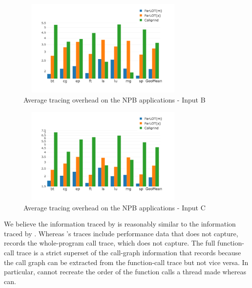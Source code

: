 \begin{figure}[t]
\centering
\includegraphics[width=3.4in,height=1.9in]{figs.comet.newMed/comet_chartAvg_sd_B_p3_5.png}
\caption{Average tracing overhead on the NPB applications - Input B}
\label{comet_chartAvg_sd_B_p3_5}
\end{figure}

\begin{figure}[t]
\centering
\includegraphics[width=3.4in,height=1.9in]{figs.comet.newMed/comet_chartAvg_sd_C_p3_5.png}
\caption{ Average tracing overhead on the NPB applications - Input C}
\label{comet_chartAvg_sd_C_p3_5}
\end{figure}


We believe the information traced by \callgrind is reasonably similar to the information traced by \parlotm.
%
Whereas \callgrind 's traces include performance data that \parlot does not capture, \parlot records the whole-program call trace, which \callgrind does not capture.
%
The full function-call trace is a strict superset of the call-graph information that \callgrind records because the call graph can be extracted from the function-call trace but not vice versa.
%
In particular, \callgrind cannot recreate the order of the function calls a thread made whereas \parlot can.


